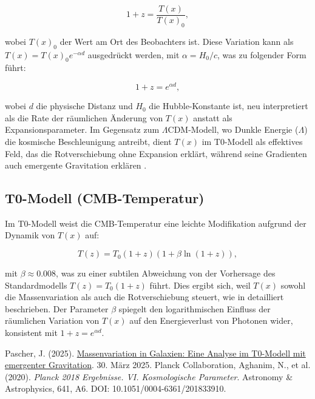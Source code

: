 \documentclass[a4paper,12pt]{article}
\newcommand{\Tfield}{T(x)}
\newcommand{\repobase}{https://github.com/jpascher/T0-Time-Mass-Duality/tree/main/2/}
\begin{document}
	\begin{equation}
		1 + z = \frac{\Tfield}{\Tfield_0},
	\end{equation}
	
	wobei \( \Tfield_0 \) der Wert am Ort des Beobachters ist. Diese Variation kann als \( \Tfield = \Tfield_0 e^{-\alpha d} \) ausgedrückt werden, mit \( \alpha = H_0/c \), was zu folgender Form führt:
	
	\begin{equation}
		1 + z = e^{\alpha d},
	\end{equation}
	
	wobei \( d \) die physische Distanz und \( H_0 \) die Hubble-Konstante ist, neu interpretiert als die Rate der räumlichen Änderung von \( \Tfield \) anstatt als Expansionsparameter. Im Gegensatz zum \(\Lambda\)CDM-Modell, wo Dunkle Energie (\(\Lambda\)) die kosmische Beschleunigung antreibt, dient \( \Tfield \) im T0-Modell als effektives Feld, das die Rotverschiebung ohne Expansion erklärt, während seine Gradienten auch emergente Gravitation erklären \cite{pascher_galaxies_2025}.
	
	\subsection{T0-Modell (CMB-Temperatur)}
	
	Im T0-Modell weist die CMB-Temperatur eine leichte Modifikation aufgrund der Dynamik von \( \Tfield \) auf:
	
	\begin{equation}
		T(z) = T_0 (1 + z) (1 + \beta \ln(1 + z)),
	\end{equation}
	
	mit \( \beta \approx 0.008 \), was zu einer subtilen Abweichung von der Vorhersage des Standardmodells \( T(z) = T_0 (1 + z) \) führt. Dies ergibt sich, weil \( \Tfield \) sowohl die Massenvariation als auch die Rotverschiebung steuert, wie in \cite{pascher_galaxies_2025} detailliert beschrieben. Der Parameter \( \beta \) spiegelt den logarithmischen Einfluss der räumlichen Variation von \( \Tfield \) auf den Energieverlust von Photonen wider, konsistent mit \( 1 + z = e^{\alpha d} \).
	
	
	\begin{thebibliography}{9}
		 Pascher, J. (2025). \href{\repobase/pdf/Deutsch/Massenvariation in Galaxien - Eine Analyse im T0-Modell mit emergenter Gravitation.pdf}{Massenvariation in Galaxien: Eine Analyse im T0-Modell mit emergenter Gravitation}. 30. März 2025.
		 Planck Collaboration, Aghanim, N., et al. (2020). \textit{Planck 2018 Ergebnisse. VI. Kosmologische Parameter}. Astronomy \& Astrophysics, 641, A6. DOI: 10.1051/0004-6361/201833910.
	\end{thebibliography}
	
\end{document}
